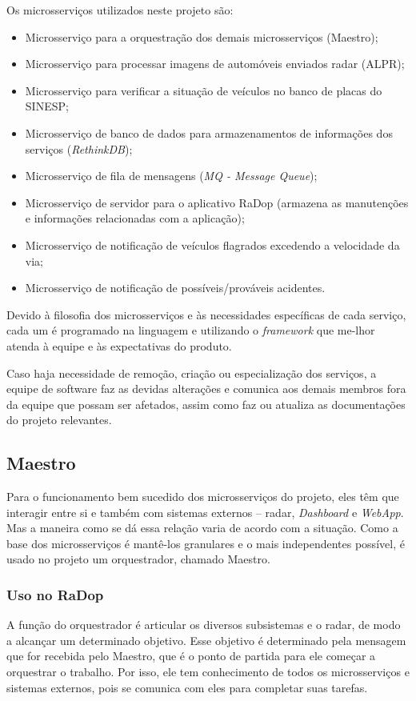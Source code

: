 Os microsserviços utilizados neste projeto são:

\begin{itemize}
    \item Microsserviço para a orquestração dos demais microsserviços (Maestro);
    \item Microsserviço para processar imagens de automóveis enviados radar (ALPR);
    \item Microsserviço para verificar a situação de veículos no banco de placas do SINESP;
    \item Microsserviço de banco de dados para armazenamentos de informações dos serviços (\textit{RethinkDB});
    \item Microsserviço de fila de mensagens (\textit{MQ - Message Queue});
    \item Microsserviço de servidor para o aplicativo RaDop (armazena as manutenções e informações relacionadas com a aplicação);
    \item Microsserviço de notificação de veículos flagrados excedendo a velocidade da via;
    \item Microsserviço de notificação de possíveis/prováveis acidentes.
\end{itemize}

Devido à filosofia dos microsserviços e às necessidades específicas de cada serviço, cada um é programado na linguagem e utilizando o \textit{framework} que me-lhor atenda à equipe e às expectativas do produto.

Caso haja necessidade de remoção, criação ou especialização dos serviços, a equipe de software faz as devidas alterações e comunica aos demais membros fora da equipe que possam ser afetados, assim como faz ou atualiza as documentações do projeto relevantes.

\subsection{Maestro}
Para o funcionamento bem sucedido dos microsserviços do projeto, eles têm que interagir entre si e também com sistemas externos -- radar, \textit{Dashboard} e \textit{WebApp}. Mas a maneira como se dá essa relação varia de acordo com a situação. Como a base dos microsserviços é mantê-los granulares e o mais independentes possível, é usado no projeto um orquestrador, chamado Maestro.

\subsubsection{Uso no RaDop}
A função do orquestrador é articular os diversos subsistemas e o radar, de modo a alcançar um determinado objetivo. Esse objetivo é determinado pela mensagem que for recebida pelo Maestro, que é o ponto de partida para ele começar a orquestrar o trabalho. Por isso, ele tem conhecimento de todos os microsserviços e sistemas externos, pois se comunica com eles para completar suas tarefas.

